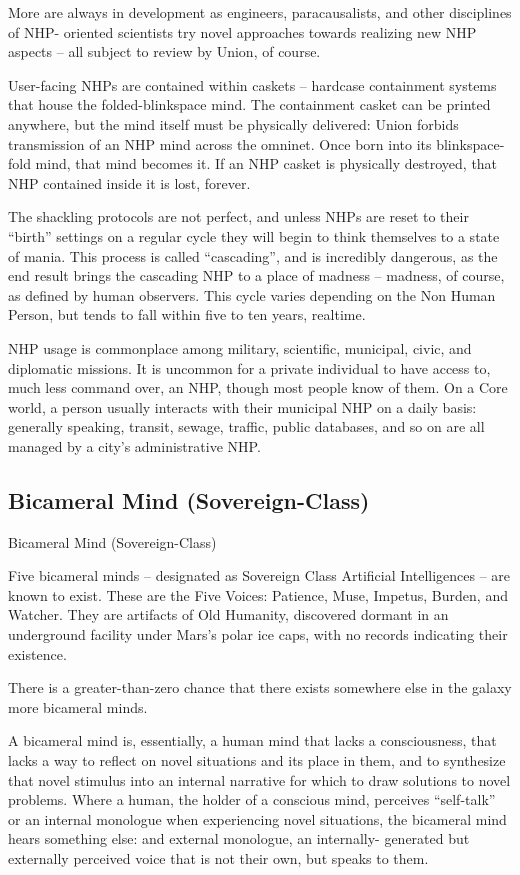 More are always in development as engineers, paracausalists, and other disciplines of NHP-
oriented scientists try novel approaches towards realizing new NHP aspects -- all subject to
review by Union, of course.


User-facing NHPs are contained within caskets -- hardcase containment systems that house the
folded-blinkspace mind. The containment casket can be printed anywhere, but the mind itself
must be physically delivered: Union forbids transmission of an NHP mind across the omninet.
Once born into its blinkspace-fold mind, that mind becomes it. If an NHP casket is physically
destroyed, that NHP contained inside it is lost, forever.





The shackling protocols are not perfect, and unless NHPs are reset to their “birth” settings on a
regular cycle they will begin to think themselves to a state of mania. This process is called
“cascading”, and is incredibly dangerous, as the end result brings the cascading NHP to a place
of madness -- madness, of course, as defined by human observers. This cycle varies depending
on the Non Human Person, but tends to fall within five to ten years, realtime.


NHP usage is commonplace among military, scientific, municipal, civic, and diplomatic missions.
It is uncommon for a private individual to have access to, much less command over, an NHP,
though most people know of them. On a Core world, a person usually interacts with their
municipal NHP on a daily basis: generally speaking, transit, sewage, traffic, public databases,
and so on are all managed by a city’s administrative NHP.

\subsection{Bicameral Mind (Sovereign-Class)}
Bicameral Mind (Sovereign-Class)

Five bicameral minds -- designated as Sovereign Class Artificial Intelligences -- are known to
exist. These are the Five Voices: Patience, Muse, Impetus, Burden, and Watcher. They are
artifacts of Old Humanity, discovered dormant in an underground facility under Mars’s polar ice
caps, with no records indicating their existence.


There is a greater-than-zero chance that there exists somewhere else in the galaxy more
bicameral minds.


A bicameral mind is, essentially, a human mind that lacks a consciousness, that lacks a way to
reflect on novel situations and its place in them, and to synthesize that novel stimulus into an
internal narrative for which to draw solutions to novel problems. Where a human, the holder of a
conscious mind, perceives “self-talk” or an internal monologue when experiencing novel
situations, the bicameral mind hears something else: and external monologue, an internally-
generated but externally perceived voice that is not their own, but speaks to them.


